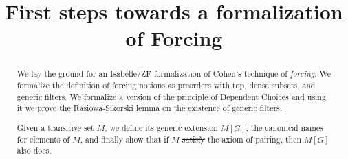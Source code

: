 \documentclass[9pt]{article} %
\theoremstyle{definition}
\theoremstyle{remark}
\providecommand{\DIFadd}[1]{{\protect\color{blue}\uwave{#1}}} %
\providecommand{\DIFdel}[1]{{\protect\color{red}\sout{#1}}}                      %
\providecommand{\DIFaddbegin}{} %
\providecommand{\DIFaddend}{} %
\providecommand{\DIFdelbegin}{} %
\providecommand{\DIFdelend}{} %
\begin{document}
  \title{First steps towards a formalization of Forcing}
  \maketitle
\begin{abstract} 
  We lay the ground for an Isabelle/ZF formalization of Cohen's technique of
  \emph{forcing}. We formalize the definition of forcing notions as
  preorders with top, dense subsets, and generic filters. We formalize
  a version of the principle of Dependent Choices and using it
  we prove the Rasiowa-Sikorski lemma on the existence of generic filters.

  Given a transitive set $M$, we define its generic extension $M[G]$,
  the canonical names for elements of $M$, and finally show that if $M$
  \DIFdelbegin \DIFdel{satisfy }\DIFdelend \DIFaddbegin \DIFadd{satisfies }\DIFaddend the axiom of pairing, then $M[G]$ also does.
\end{abstract}
\end{document}
